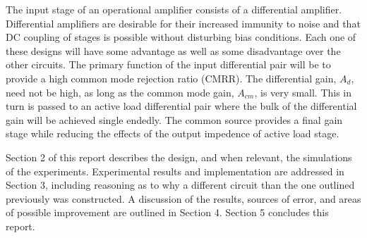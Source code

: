 The input stage of an operational amplifier consists of a differential amplifier. Differential amplifiers are
desirable for their increased immunity to noise and that DC coupling of stages is possible without disturbing bias conditions. Each one of these designs will have some
advantage as well as some disadvantage over the other circuits. The primary function of the input
differential pair will be to provide a high common mode rejection ratio (CMRR). The differential gain,
$A_d$, need not be high, as long as the common mode gain, $A_{cm}$, is very small. This in turn is passed to an active load differential pair where the bulk of the differential gain will be achieved single endedly. The common source provides a final gain stage while reducing the effects of the output impedence of active load stage. 


\noindent Section 2 of this report describes the design, and when relevant, the simulations of the experiments. Experimental results and implementation are addressed in Section 3, including reasoning as to why a different circuit than the one outlined previously was constructed. A discussion of the results, sources of error, and areas of possible improvement are outlined in Section 4. Section 5 concludes this report. \newline

